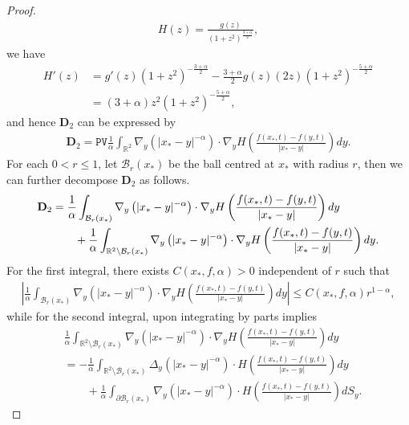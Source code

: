 \documentclass[reqno]{amsart}%
\theoremstyle{definition}
\theoremstyle{remark}
\numberwithin{equation}{section}
\newcommand{\0}{\mathbf{0}}
\newcommand{\1}{\mathbf{1}}
\newcommand{\PV}{\texttt{PV}}
\numberwithin{equation}{section}
\numberwithin{theorem}{section}
\numberwithin{figure}{section}
\begin{document}
\begin{proof}
{\begin{align*}
H(z)=\frac{g(z)}{(1+z^2)^\frac{3+\alpha}{2}},
\end{align*}
we have
\begin{align*}
H'(z)&=g'(z)(1+z^2)^{-\frac{3+\alpha}{2}}-\frac{3+\alpha}{2}g(z)(2z)(1+z^2)^{-\frac{5+\alpha}{2}}\\
&=(3+\alpha)z^2(1+z^2)^{-\frac{5+\alpha}{2}},
\end{align*}
and hence $\mathbf{D}_{2}$ can be expressed by
\begin{align*}
\mathbf{D}_{2}= \PV \frac{1}{\alpha} \int_{\mathbb{R}^2} \nabla_y \left( |x_* - y|^{-\alpha} \right) \cdot \nabla_y H \left( \frac{f{(x_*,t)} - f{(y,t)}}{|x_* - y|} \right) dy.
\end{align*}
For each $0<r\le 1$, let $\mathcal{B}_r(x_{*})$ be the ball centred at $x_{*}$ with radius $r$, then we can further decompose $\mathbf{D}_{2}$ as follows.
\begin{align}\label{D2 def revised}
\mathbf{D}_{2}&=\frac{1}{\alpha} \int_{\mathcal{B}_r(x_{*})} \nabla_y \left( |x_* - y|^{-\alpha} \right) \cdot \nabla_y H \left( \frac{f{(x_*,t)} - f{(y,t)}}{|x_* - y|} \right) dy\notag\\
&\qquad+\frac{1}{\alpha} \int_{\mathbb{R}^2\setminus\mathcal{B}_r(x_{*})} \nabla_y \left( |x_* - y|^{-\alpha} \right) \cdot \nabla_y H \left( \frac{f{(x_*,t)} - f{(y,t)}}{|x_* - y|} \right) dy.
\end{align}
For the first integral, there exists $C(x_*,f,\alpha)>0$ independent of $r$ such that
\begin{align*}
\left|\frac{1}{\alpha} \int_{\mathcal{B}_r(x_{*})} \nabla_y \left( |x_* - y|^{-\alpha} \right) \cdot \nabla_y H \left( \frac{f{(x_*,t)} - f{(y,t)}}{|x_* - y|} \right) dy\right|\le C(x_*,f,\alpha)r^{1-\alpha},
\end{align*} 
while for the second integral, upon integrating by parts implies
\begin{align*}
&\frac{1}{\alpha} \int_{\mathbb{R}^2\setminus\mathcal{B}_r(x_{*})} \nabla_y \left( |x_* - y|^{-\alpha} \right) \cdot \nabla_y H \left( \frac{f{(x_*,t)} - f{(y,t)}}{|x_* - y|} \right) dy\\
&=-\frac{1}{\alpha} \int_{\mathbb{R}^2\setminus\mathcal{B}_r(x_{*})} \Delta_y \left( |x_* - y|^{-\alpha} \right) \cdot H \left( \frac{f{(x_*,t)} - f{(y,t)}}{|x_* - y|} \right) dy\\
&\qquad+\frac{1}{\alpha} \int_{\partial\mathcal{B}_r(x_{*})} \nabla_y \left( |x_* - y|^{-\alpha} \right) \cdot H \left( \frac{f{(x_*,t)} - f{(y,t)}}{|x_* - y|} \right) dS_y.

\end{align*}}
\end{proof}
\end{document}
